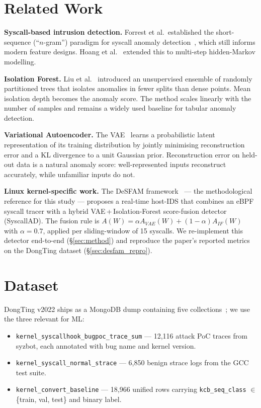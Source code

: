 \documentclass[conference,10pt]{IEEEtran}
\begin{document}
\section{Related Work}
\label{sec:related}

\textbf{Syscall-based intrusion detection.} Forrest et al.\ established the
short-sequence (``$n$-gram'') paradigm for syscall anomaly
detection~\cite{forrest1996sense}, which still informs modern feature
designs. Hoang et al.~\cite{hoang2003multistep} extended this to multi-step
hidden-Markov modelling.

\textbf{Isolation Forest.} Liu et al.~\cite{liu2008iforest} introduced an
unsupervised ensemble of randomly partitioned trees that isolates anomalies
in fewer splits than dense points. Mean isolation depth becomes the
anomaly score. The method scales linearly with the number of samples and
remains a widely used baseline for tabular anomaly detection.

\textbf{Variational Autoencoder.} The VAE~\cite{kingma2014vae} learns a
probabilistic latent representation of its training distribution by
jointly minimising reconstruction error and a KL divergence to a unit
Gaussian prior. Reconstruction error on held-out data is a natural
anomaly score: well-represented inputs reconstruct accurately, while
unfamiliar inputs do not.

\textbf{Linux kernel-specific work.} The DeSFAM
framework~\cite{desfam2025access} --- the methodological reference for
this study --- proposes a real-time host-IDS that combines an eBPF
syscall tracer with a hybrid VAE\,+\,Isolation-Forest score-fusion
detector (SyscallAD). The fusion rule is
$A(W) = \alpha A_{VAE}(W) + (1-\alpha) A_{IF}(W)$ with $\alpha = 0.7$,
applied per sliding-window of 15 syscalls. We re-implement this detector
end-to-end (\S\ref{sec:method}) and reproduce the paper's reported
metrics on the DongTing dataset (\S\ref{sec:desfam_repro}).

\section{Dataset}
\label{sec:dataset}

DongTing v2022 ships as a MongoDB dump containing five
collections~\cite{duan2023dongting}; we use the three relevant for ML:

\begin{itemize}
  \item \texttt{kernel\_syscallhook\_bugpoc\_trace\_sum} --- 12{,}116
        attack PoC traces from syzbot, each annotated with bug name and
        kernel version.
  \item \texttt{kernel\_syscall\_normal\_strace} --- 6{,}850 benign
        strace logs from the GCC test suite.
  \item \texttt{kernel\_convert\_baseline} --- 18{,}966 unified rows
        carrying \texttt{kcb\_seq\_class} $\in$ \{train, val, test\} and
        binary label.
\end{itemize}
\end{document}

